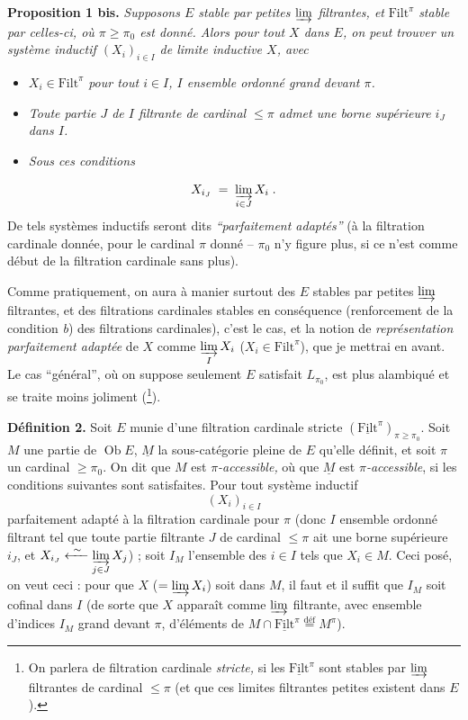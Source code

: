 \documentclass[11pt]{article}
\newcommand{\printedpage}[1]{\marginpar{\footnotesize p.~#1}}
\newcommand{\msp}[1]{\marginpar{\footnotesize [#1]}}
\newcommand{\Filt}{\mathrm{Filt}}
\newcommand{\Ob}{\operatorname{Ob}}
\begin{document}
\textbf{Proposition 1 bis.} \textit{Supposons $E$ stable par petites $\varinjlim$ filtrantes, et} $\Filt^\pi$ \textit{stable par celles-ci, où $\pi\ge\pi_0$ est donné. Alors pour tout $X$ dans $E$, on peut trouver un système inductif $(X_i)_{i\in I}$ de limite inductive $X$, avec}

\begin{itemize}
\item[a)] $X_i\in\Filt^\pi$ \textit{pour tout $i\in I$, $I$ ensemble ordonné grand devant $\pi$.}
\item[b)] \textit{Toute partie $J$ de $I$ filtrante de cardinal $\le\pi$ admet une borne supérieure $i_J$ dans $I$.}
\item[c)] \textit{Sous ces conditions}
\end{itemize}

\printedpage{47}
\msp{page 86}
\[
X_{i_J} \;=\; \varinjlim_{i\in J} X_i \;.
\]
De tels systèmes inductifs seront dits \textit{“parfaitement adaptés”} (à la filtration cardinale donnée, pour le cardinal $\pi$ donné – $\pi_0$ n'y figure plus, si ce n'est comme début de la filtration cardinale sans plus).

Comme pratiquement, on aura à manier surtout des $E$ stables par petites $\varinjlim$ filtrantes, et des filtrations cardinales stables en conséquence (renforcement de la condition \textit{b}) des filtrations cardinales), c'est le cas, et la notion de \textit{représentation parfaitement adaptée} de $X$ comme $\varinjlim\limits_{I} X_i$ ($X_i\in\Filt^\pi$), que je mettrai en avant. Le cas “général”, où on suppose seulement $E$ satisfait $L_{\pi_0}$, est plus alambiqué et se traite moins joliment (\footnote[41]{On parlera de filtration cardinale \textit{stricte,} si les $\underline{\Filt}^\pi$ sont stables par $\varinjlim$ filtrantes de cardinal $\le\pi$ (et que ces limites filtrantes petites existent dans $E$).}).

\textbf{Définition 2.} Soit $E$ munie d'une filtration cardinale stricte $(\underline{\Filt}^\pi)_{\pi\ge\pi_0}$. Soit $M$ une partie de $\Ob E$, $\underline{M}$ la sous-catégorie pleine de $E$ qu'elle définit, et soit $\pi$ un cardinal $\ge\pi_0$. On dit que $M$ est \textit{$\pi$-accessible,} où que $\underline{M}$ est \textit{$\pi$-accessible}, %
\msp{page 87}
si les conditions suivantes sont satisfaites. Pour tout système inductif
\[
(X_i)_{i\in I}
\]
parfaitement adapté à la filtration cardinale pour $\pi$ (donc $I$ ensemble ordonné filtrant tel que toute partie filtrante $J$ de cardinal $\le\pi$ ait une borne supérieure $i_J$, et $X_{i_J}\xleftarrow{\ \sim\ }\varinjlim\limits_{j\in J} X_j$) ; soit $I_M$ l'ensemble des $i\in I$ tels que $X_i\in M$. Ceci posé, on veut ceci : pour que $X$ ($=\varinjlim X_i$) soit dans $M$, il faut et il suffit que $I_M$ soit cofinal dans $I$ (de sorte que $X$ apparaît comme $\varinjlim$ filtrante, avec ensemble d'indices $I_M$ grand devant $\pi$, d'éléments de $M\cap\underline{\Filt}^\pi\overset{\text{déf}}{=}M^\pi$).
\end{document}
